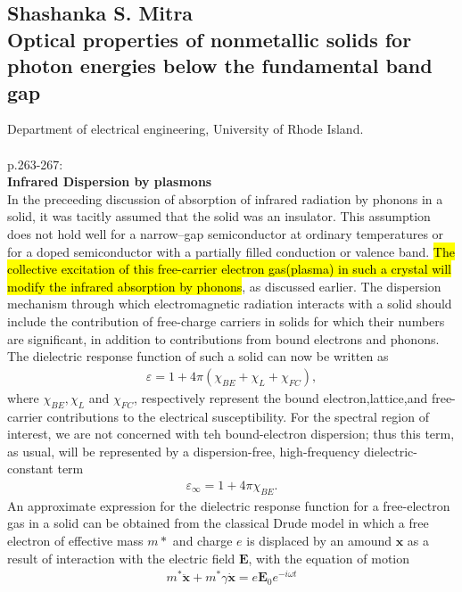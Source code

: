 \subsection{Shashanka S. Mitra \\ Optical properties of nonmetallic solids for photon energies below the fundamental band gap}
Department of electrical engineering, University of Rhode Island.
\\
\\
p.263-267:\\
\textbf{Infrared Dispersion by plasmons}\\
In the preceeding discussion of absorption of infrared radiation by phonons in a solid, it was tacitly
assumed that the solid was an insulator. This assumption does not hold well for a narrow--gap semiconductor at
ordinary temperatures or for a doped semiconductor with a partially filled conduction or valence band.
\hl{The collective excitation of this free-carrier electron gas(plasma) in such a crystal will modify the
infrared absorption by phonons}, as discussed earlier. The dispersion mechanism through which electromagnetic
radiation interacts with a solid should include the contribution of free-charge carriers in solids for which
their numbers are significant, in addition to contributions from bound electrons and phonons.
The dielectric response function of such a solid can now be written as 
\begin{align}
   \varepsilon = 1 + 4\pi(\chi_{BE} + \chi_L + \chi_{FC}),
\end{align}
where $\chi_{BE}, \chi_L$ and $\chi_{FC}$, respectively represent the bound electron,lattice,and
free-carrier contributions to the electrical susceptibility. For the spectral region of interest, we
are not concerned with teh bound-electron dispersion; thus this term, as usual, will be 
represented by a dispersion-free, high-frequency dielectric-constant term
\begin{align}
   \varepsilon_{\infty} = 1 + 4\pi \chi_{BE}.
\end{align}
An approximate expression for the dielectric response function for a free-electron gas in a solid can be
obtained from the classical Drude model in which a free electron of effective mass $m*$ and charge $e$
is displaced by an amound $\boldsymbol x$ as a result of interaction with the electric field 
$\boldsymbol E$, with the equation of motion
\begin{align}
   m^* \ddot{\boldsymbol x} + m^* \gamma \dot{\boldsymbol x} = e \boldsymbol E_0 e^{-i\omega t}
\end{align}
